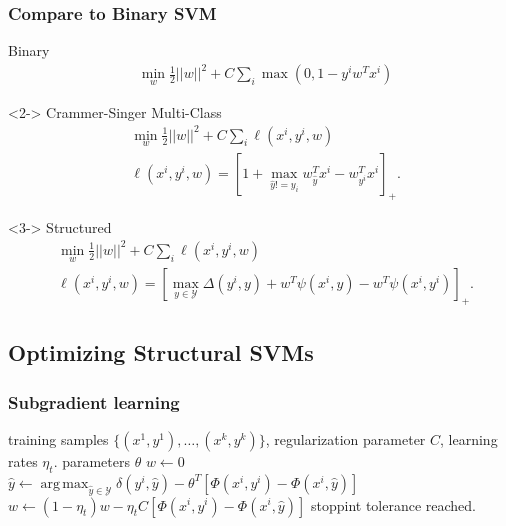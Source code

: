 \documentclass[final,ignorenonframetext,compress]{beamer}
\DeclareMathOperator*{\argmax}{arg\,max}
\newcommand{\hoch}[1]{^{#1}}
\begin{document}
\begin{frame}
    \frametitle{Compare to Binary SVM}
    Binary
    \vspace{-5mm}
        \begin{align*}
            &\min_w \frac{1}{2} ||w||^2 + C \sum_i  \max(0, 1- y\hoch{i} w^T x\hoch{i})
        \end{align*}
    \begin{visibleenv}<2->
        Crammer-Singer Multi-Class
        \begin{align*}
            &\min_w \frac{1}{2} ||w||^2 + C \sum_i  \ell(x\hoch{i}, y\hoch{i}, w)\\
            &\ell(x\hoch{i}, y\hoch{i}, w) = [1 + \max_{\hat{y}!=y_i}w_{\hat{y}}^T x\hoch{i} - w_{y\hoch{i}}^T x\hoch{i}]_+.
        \end{align*}
    \end{visibleenv}
    \begin{visibleenv}<3->
        Structured
        \begin{align*}
            &\min_w \frac{1}{2} ||w||^2 + C \sum_i  \ell(x\hoch{i}, y\hoch{i}, w)\\
            &\ell(x\hoch{i}, y\hoch{i}, w) = [\max_{y \in \mathcal{Y}} \Delta(y\hoch{i}, y) + w^T \psi(x\hoch{i}, y) - w^T \psi(x\hoch{i}, y\hoch{i})]_+.
        \end{align*}
    \end{visibleenv}



\end{frame}

\subsection{Optimizing Structural SVMs}

\begin{frame}
    \frametitle{Subgradient learning}
    \tiny
    \begin{algorithmic}[1]
        \Require training samples $\{ (x\hoch{1}, y\hoch{1}), \dots, (x\hoch{k}, y\hoch{k})\}$, regularization parameter $C$, learning rates $\eta_t$.
        \Ensure parameters $\theta$
        \State $w \leftarrow 0$
        \Repeat
                $\hat{y} \leftarrow \displaystyle \argmax_{\hat{y}\in\mathcal{Y}} \delta(y\hoch{i}, \hat{y}) - \theta^T [\Phi(x\hoch{i}, y\hoch{i}) - \Phi(x\hoch{i}, \hat{y})] $
                \State $w \leftarrow (1 - \eta_t) w - \eta_t C [\Phi(x\hoch{i}, y\hoch{i}) - \Phi(x\hoch{i}, \hat{y})]$
            \EndFor
            \vspace{-10mm}
            \Until stoppint tolerance reached.
        \end{algorithmic}
\end{frame}
\end{document}
